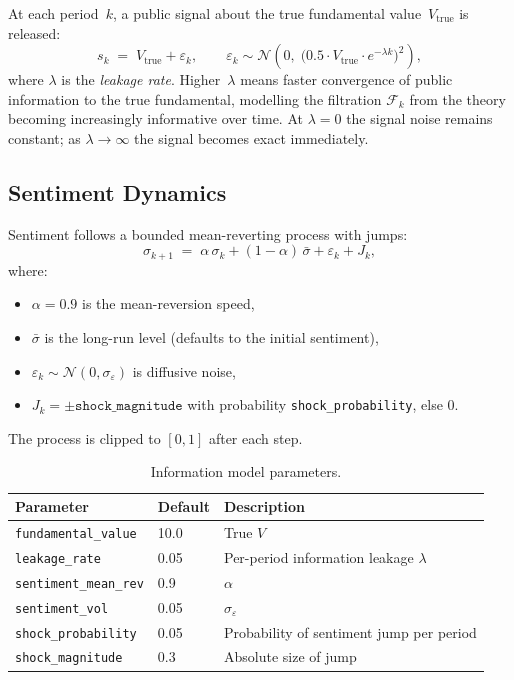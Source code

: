\documentclass[11pt,a4paper]{article}
\newcommand{\cF}{\mathcal{F}}
\begin{document}
At each period~$k$, a public signal about the true fundamental value~$V_{\text{true}}$ is released:
\begin{equation}\label{eq:public-signal}
  s_k \;=\; V_{\text{true}} + \varepsilon_k, \qquad \varepsilon_k \sim \mathcal{N}\!\left(0,\;\bigl(0.5\cdot V_{\text{true}}\cdot e^{-\lambda k}\bigr)^2\right),
\end{equation}
where $\lambda$ is the \emph{leakage rate}.  Higher~$\lambda$ means faster convergence of public information to the true fundamental, modelling the filtration $\cF_k$ from the theory becoming increasingly informative over time.  At $\lambda = 0$ the signal noise remains constant; as $\lambda \to \infty$ the signal becomes exact immediately.


\subsection{Sentiment Dynamics}
\label{sec:sentiment}

Sentiment follows a bounded mean-reverting process with jumps:
\begin{equation}\label{eq:sentiment}
  \sigma_{k+1} \;=\; \alpha\,\sigma_k + (1 - \alpha)\,\bar{\sigma} + \varepsilon_k + J_k,
\end{equation}
where:
\begin{itemize}[nosep]
  \item $\alpha = 0.9$ is the mean-reversion speed,
  \item $\bar{\sigma}$ is the long-run level (defaults to the initial sentiment),
  \item $\varepsilon_k \sim \mathcal{N}(0, \sigma_{\varepsilon})$ is diffusive noise,
  \item $J_k = \pm\texttt{shock\_magnitude}$ with probability \texttt{shock\_probability}, else $0$.
\end{itemize}
The process is clipped to $[0,1]$ after each step.

\begin{table}[h]
\centering
\caption{Information model parameters.}
\label{tab:info}
\begin{tabular}{@{}lll@{}}
\toprule
\textbf{Parameter} & \textbf{Default} & \textbf{Description} \\
\midrule
\texttt{fundamental\_value}     & 10.0  & True $V$ \\
\texttt{leakage\_rate}          & 0.05  & Per-period information leakage $\lambda$ \\
\texttt{sentiment\_mean\_rev}   & 0.9   & $\alpha$ \\
\texttt{sentiment\_vol}         & 0.05  & $\sigma_\varepsilon$ \\
\texttt{shock\_probability}     & 0.05  & Probability of sentiment jump per period \\
\texttt{shock\_magnitude}       & 0.3   & Absolute size of jump \\
\bottomrule
\end{tabular}
\end{table}
\end{document}
